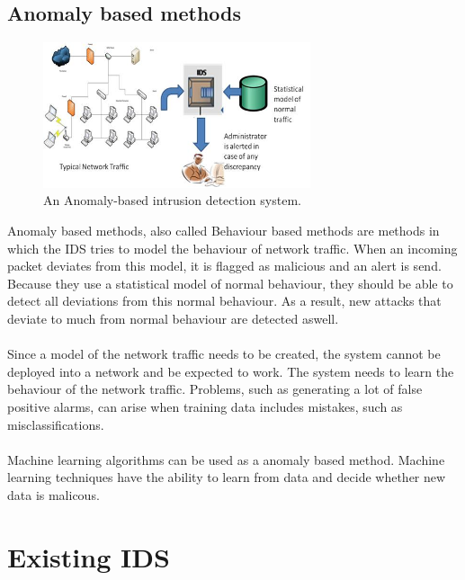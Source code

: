 \subsection{Anomaly based methods}
\begin{figure}[H]
\centering
\includegraphics[width=0.7\textwidth]{Figures/Anomaly-based-Intrusion-Detection-System}
\decoRule
\caption[Anomaly based IDS]{An Anomaly-based intrusion detection system.}
\label{fig:Anomaly}
\end{figure}
\noindent Anomaly based methods, also called Behaviour based methods are methods in which the IDS tries to model the behaviour of network traffic. When an incoming packet deviates from this model, it is flagged as malicious and an alert is send. Because they use a statistical model of normal behaviour, they should be able to detect all deviations from this normal behaviour. As a result, new attacks that deviate to much from normal behaviour are detected aswell. \\
\\
Since a model of the network traffic needs to be created, the system cannot be deployed into a network and be expected to work. The system needs to learn the behaviour of the network traffic. Problems, such as generating a lot of false positive alarms, can arise when training data includes mistakes, such as misclassifications. \\
\\
Machine learning algorithms can be used as a anomaly based method. Machine learning techniques have the ability to learn from data and decide whether new data is malicous. 

\section{Existing IDS}